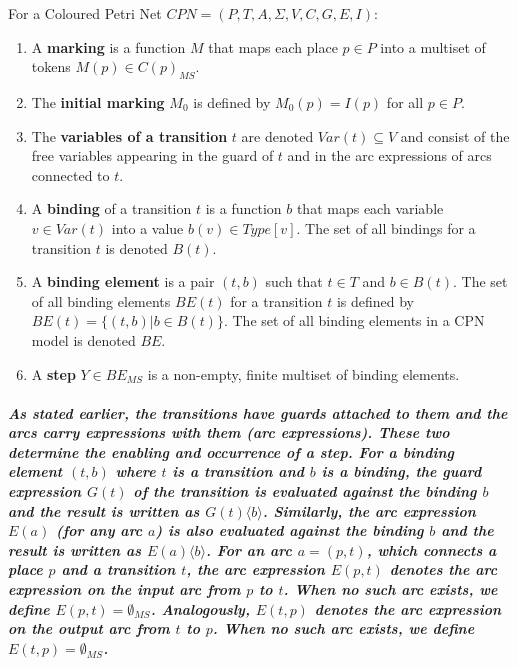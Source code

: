 \begin{defs}
	\label{defs:2_7_step_marking}
	For a Coloured Petri Net $\mathit{CPN = (P,T,A,\Sigma,V,C,G,E,I)}$:
	\begin{enumerate}
		\item A \textbf{marking} is a function $\mathit{M}$ that maps each place $\mathit{p \in P}$ into a multiset of tokens
		$\mathit{M(p) \in C(p)_{MS}}$.
		\item The \textbf{initial marking} $\mathit{M_{0}}$ is defined by $\mathit{M_{0}(p) = I(p)}$ for all $\mathit{p \in P}$.
		\item The \textbf{variables of a transition} $\mathit{t}$ are denoted $\mathit{Var(t) \subseteq V}$ and consist of the free variables appearing in the guard of $\mathit{t}$ and in the arc expressions of arcs connected to $\mathit{t}$.
		\item A \textbf{binding} of a transition $\mathit{t}$ is a function $\mathit{b}$ that maps each variable $\mathit{v \in Var(t)}$ into a value $\mathit{b(v) \in Type[v]}$. The set of all bindings for a transition $\mathit{t}$ is denoted $\mathit{B(t)}$.
		\item A \textbf{binding element} is a pair $\mathit{(t,b)}$ such that $\mathit{t \in T}$ and $\mathit{b \in B(t)}$. The set of all binding elements $\mathit{BE(t)}$ for a transition $\mathit{t}$ is defined by $\mathit{BE(t)} = \mathit{\{(t,b) | b \in B(t)\}}$. The set of all binding elements in a CPN model is denoted $\mathit{BE}$.
		\item A \textbf{step} $\mathit{Y \in BE_{MS}}$ is a non-empty, finite multiset of binding elements.
	\end{enumerate}
\end{defs}

\subparagraph*{\textnormal{As stated earlier, the transitions have guards attached to them and the arcs carry expressions with them (arc expressions). These two determine the enabling and occurrence of a step. For a binding element $\mathit{(t,b)}$ where $\mathit{t}$ is a transition and $\mathit{b}$ is a binding, the guard expression $\mathit{G(t)}$ of the transition is evaluated against the binding $\mathit{b}$ and the result is written as $\mathit{G(t)\langle b \rangle}$. Similarly, the arc expression $\mathit{E(a)}$ (for any arc $\mathit{a}$) is also evaluated against the binding $\mathit{b}$ and the result is written as $\mathit{E(a)\langle b \rangle}$. For an arc $\mathit{a = (p,t)}$, which connects a place $\mathit{p}$ and a transition $\mathit{t}$, the arc expression $\mathit{E(p,t)}$ denotes the arc expression on the input arc from $\mathit{p}$ to $\mathit{t}$. When no such arc exists, we define $\mathit{E(p, t) = \emptyset_{MS}}$. Analogously, $\mathit{E(t, p)}$ denotes the arc expression on the output arc from $\mathit{t}$ to $\mathit{p}$. When no such arc exists, we define $\mathit{E(t, p) = \emptyset_{MS}}$.}}

